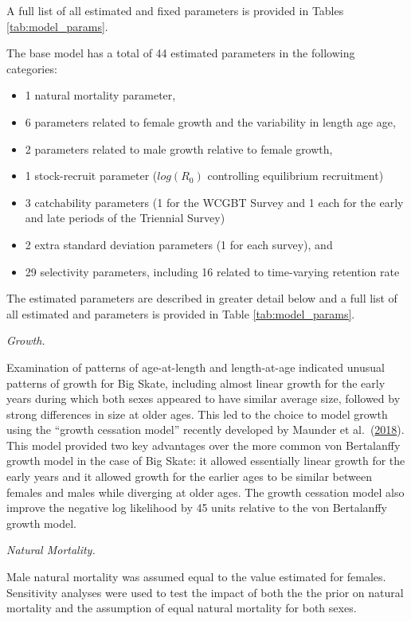 \documentclass[12pt,]{article}
\begin{document}
A full list of all estimated and fixed parameters is provided in Tables
\ref{tab:model_params}.

The base model has a total of 44 estimated parameters in the following
categories:

\begin{itemize}
  \item 1 natural mortality parameter,
  \item 6 parameters related to female growth and the variability in length age age,
  \item 2 parameters related to male growth relative to female growth,
  \item 1 stock-recruit parameter ($log(R_0)$ controlling equilibrium recruitment)
  \item 3 catchability parameters (1 for the WCGBT Survey and 1 each for the early and late periods of the Triennial Survey)
  \item 2 extra standard deviation parameters (1 for each survey), and
  \item 29 selectivity parameters, including 16 related to time-varying retention rate
\end{itemize}

The estimated parameters are described in greater detail below and a
full list of all estimated and parameters is provided in Table
\ref{tab:model_params}.

\emph{Growth.}

Examination of patterns of age-at-length and length-at-age indicated
unusual patterns of growth for Big Skate, including almost linear growth
for the early years during which both sexes appeared to have similar
average size, followed by strong differences in size at older ages. This
led to the choice to model growth using the ``growth cessation model''
recently developed by Maunder et
al.~(\protect\hyperlink{ref-maunder2018growth}{2018}). This model
provided two key advantages over the more common von Bertalanffy growth
model in the case of Big Skate: it allowed essentially linear growth for
the early years and it allowed growth for the earlier ages to be similar
between females and males while diverging at older ages. The growth
cessation model also improve the negative log likelihood by 45 units
relative to the von Bertalanffy growth model.

\emph{Natural Mortality.}

Male natural mortality was assumed equal to the value estimated for
females. Sensitivity analyses were used to test the impact of both the
the prior on natural mortality and the assumption of equal natural
mortality for both sexes.
\end{document}
